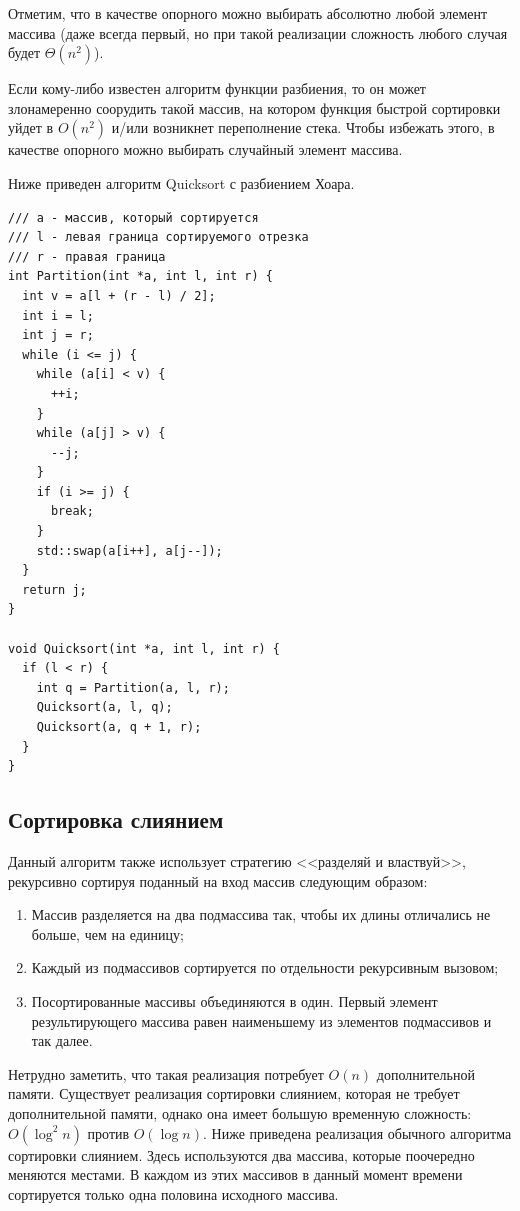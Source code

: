 Отметим, что в качестве опорного можно выбирать абсолютно любой элемент массива
(даже всегда первый, но при такой реализации сложность любого случая будет $\Theta(n^2)$).

Если кому-либо известен алгоритм функции разбиения, то он может злонамеренно соорудить
такой массив, на котором функция быстрой сортировки уйдет в $O(n^2)$ и/или возникнет
переполнение стека. Чтобы избежать этого, в качестве опорного можно выбирать случайный
элемент массива.

Ниже приведен алгоритм Quicksort с разбиением Хоара.
\begin{verbatim}
/// a - массив, который сортируется
/// l - левая граница сортируемого отрезка
/// r - правая граница
int Partition(int *a, int l, int r) {
  int v = a[l + (r - l) / 2];
  int i = l;
  int j = r;
  while (i <= j) {
    while (a[i] < v) {
      ++i;
    }
    while (a[j] > v) {
      --j;
    }
    if (i >= j) {
      break;
    }
    std::swap(a[i++], a[j--]);
  }
  return j;
}

void Quicksort(int *a, int l, int r) {
  if (l < r) {
    int q = Partition(a, l, r);
    Quicksort(a, l, q);
    Quicksort(a, q + 1, r);
  }
}
\end{verbatim}

\subsection{Сортировка слиянием}
Данный алгоритм также использует стратегию <<разделяй и властвуй>>, рекурсивно сортируя
поданный на вход массив следующим образом:
\begin{enumerate}
  \item Массив разделяется на два подмассива так, чтобы их длины отличались не больше,
        чем на единицу;
  \item Каждый из подмассивов сортируется по отдельности рекурсивным вызовом;
  \item Посортированные массивы объединяются в один. Первый элемент результирующего 
        массива равен наименьшему из элементов подмассивов и так далее.
\end{enumerate}

Нетрудно заметить, что такая реализация потребует $O(n)$ дополнительной памяти.
Существует реализация сортировки слиянием, которая не требует дополнительной памяти,
однако она имеет большую временную сложность: $O(\log^2 n)$ против $O(\log n)$.
Ниже приведена реализация обычного алгоритма сортировки слиянием. Здесь используются
два массива, которые поочередно меняются местами. В каждом из этих массивов
в данный момент времени сортируется только одна половина исходного массива.

